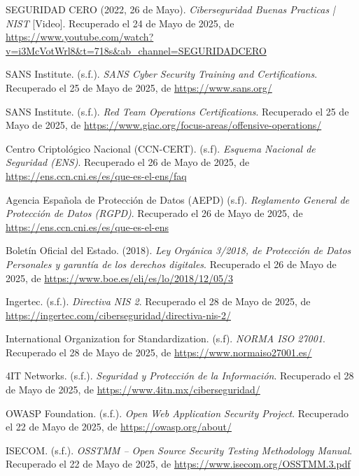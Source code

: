 \documentclass[a4paper, 11pt]{article}
\begin{document}
\begin{thebibliography}{99}
    SEGURIDAD CERO (2022, 26 de Mayo). \textit{Ciberseguridad Buenas Practicas | NIST} [Video]. Recuperado el 24 de Mayo de 2025, de \url{https://www.youtube.com/watch?v=i3McVotWrl8&t=718s&ab_channel=SEGURIDADCERO}

    SANS Institute. (s.f.). \textit{SANS Cyber Security Training and Certifications}. Recuperado el 25 de Mayo de 2025, de \url{https://www.sans.org/}

    SANS Institute. (s.f.). \textit{Red Team Operations Certifications}. Recuperado el 25 de Mayo de 2025, de \url{https://www.giac.org/focus-areas/offensive-operations/}

    Centro Criptológico Nacional (CCN-CERT). (s.f). \textit{Esquema Nacional de Seguridad (ENS)}. Recuperado el 26 de Mayo de 2025, de \url{https://ens.ccn.cni.es/es/que-es-el-ens/faq}

    Agencia Española de Protección de Datos (AEPD) (s.f). \textit{Reglamento General de Protección de Datos (RGPD)}. Recuperado el 26 de Mayo de 2025, de \url{https://ens.ccn.cni.es/es/que-es-el-ens}

    Boletín Oficial del Estado. (2018). \textit{Ley Orgánica 3/2018, de Protección de Datos Personales y garantía de los derechos digitales}. Recuperado el 26 de Mayo de 2025, de \url{https://www.boe.es/eli/es/lo/2018/12/05/3}

    Ingertec. (s.f.). \textit{Directiva NIS 2}. Recuperado el 28 de Mayo de 2025, de \url{https://ingertec.com/ciberseguridad/directiva-nis-2/}

    International Organization for Standardization. (s.f). \textit{NORMA ISO 27001}. Recuperado el 28 de Mayo de 2025, de \url{https://www.normaiso27001.es/}

    4IT Networks. (s.f.). \textit{Seguridad y Protección de la Información}. Recuperado el 28 de Mayo de 2025, de \url{https://www.4itn.mx/ciberseguridad/}

    OWASP Foundation. (s.f.). \textit{Open Web Application Security Project}. Recuperado el 22 de Mayo de 2025, de \url{https://owasp.org/about/}

    ISECOM. (s.f.). \textit{OSSTMM – Open Source Security Testing Methodology Manual}. Recuperado el 22 de Mayo de 2025, de \url{https://www.isecom.org/OSSTMM.3.pdf}


\end{thebibliography}
\end{document}
